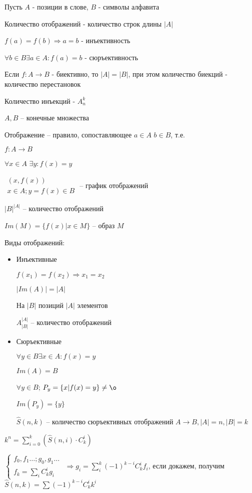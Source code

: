 \documentclass[14pt, letter paper]{article}
\begin{document}
Пусть $A$ - позиции в слове, $B$ - символы алфавита

Количество отображений - количество строк длины $|A|$

$f(a) = f(b) \Rightarrow a = b$ - инъективность

$\forall b \in B \exists a \in A: f(a) = b$ - сюръективность

Если $f: A \rightarrow B$ - биективно, то $|A| = |B|$, при этом количество биекций - количество перестановок

Количество инъекций - $A_n^k$

$A, B$ -- конечные множества 

Отображение -- правило, сопоставляющее $a \in A$ $b \in B$, т.е. 

$f: A \rightarrow B$

$\forall x \in A$ $\exists y : f(x) = y$

$\begin{gathered}
    (x, f(x)) \\
    x \in A; y = f(x) \in B
\end{gathered}$
-- график отображений

$|B|^{|A|}$ -- количество отображений

$Im(M) = \{ f(x) | x \in M\}$ -- образ $M$

Виды отображений:

\begin{itemize}
    \item Инъективные

    $f(x_1) = f(x_2) \Rightarrow x_1 = x_2$

    $|Im(A)| = |A|$

    На $|B|$ позиций $|A|$ элементов

    $A_{|B|}^{|A|}$ -- количество отображений

    \item Сюръективные

    $\forall y \in B \exists x \in A: f(x) = y$

    $Im(A) = B$

    $\forall y \in B$; $P_y = \{ x | f(x) = y\} \neq \o$

    $Im(P_y) = \{y\}$

    $\hat{S} (n, k)$ -- количество сюръективных отображений $A \rightarrow B, |A| = n, |B| = k$
\end{itemize}

$k^n = \sum\limits^k_{i=0} (\hat{S}(n, i) \cdot C_k^i)$

$\begin{cases}
    f_0, f_1 \ldots; g_0, g_1 \ldots \\
    f_k = \sum\limits_i C_k^i g_i
\end{cases}$
$\Rightarrow g_i = \sum\limits_i^k (-1)^{k-i} C_k^i f_i$, если докажем, получим $\hat{S}(n,k) = \sum (-1)^{k-i} C_k^i k^i$
\end{document}
